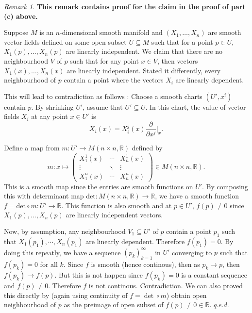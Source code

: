 \documentclass[a4paper]{article}
\theoremstyle{remark}
\newtheorem*{remark}{Remark}
\newcommand{\er}{\mathbb{R}} %
\renewcommand\qedsymbol{q.e.d.} %
\begin{document}
\begin{remark}
\textbf{This remark contains proof for the claim in the proof of part (c) above.} 
 
 Suppose $M$ is an $n$-dimensional smooth manifold and $(X_1,\dots,X_n)$ are smooth vector fields defined on some open subset $U\subseteq M$ such that for a point $p \in U$, $X_1(p),\dots,X_n(p)$ are linearly independent. We claim that there are no neighbourhood $V$ of $p$ such that for any point $x \in V$, then vectors $X_1(x),\dots,X_n(x)$ are linearly independent. Stated it differently, every neighbourhood of $p$ contain a point where the vectors $X_i$ are linearly dependent. 

This will lead to contradiction as follows : Choose a  smooth charts $(U',x^i)$ contain $p$. By shrinking $U'$, assume that $U'\subseteq U$. In this chart, the value of vector fields $X_i$ at any point $x \in U'$ is
$$
X_i(x) = X_i^j(x) \frac{\partial}{\partial x^j}\bigg|_x.
$$

Define a map from $m : U' \to M(n\times n,\mathbb{R} )$  defined by 
$$
m : x \mapsto 
\begin{pmatrix}
    X_1^1(x) & \cdots & X_n^1(x) \\
    \vdots & \ddots & \vdots \\
    X_1^n(x) & \cdots & X_n^n(x)
\end{pmatrix} \in M(n\times n,\mathbb{R} ).
$$
This is a smooth map since the entries are smooth functions on $U'$. By composing this with determinant map $\text{det} : M(n\times n, \mathbb{R}) \to \mathbb{R}$, we have a smooth function $f = \text{det} \circ m : U' \to \mathbb{R}$. This function is also smooth and at $p \in U'$, $f(p) \neq 0$ since $X_1(p),\dots,X_n(p)$ are linearly independent vectors.

Now, by assumption, any neighbourhood $V_1 \subseteq U'$ of $p$ contain a point $p_1$ such that $X_1(p_1),\cdots,X_n(p_1)$ are linearly dependent. Therefore $f(p_1) = 0$. By doing this repeatly, we have a sequence $(p_k)_{k=1}^{\infty}$ in $U'$ converging to $p$ such that $f(p_k) =0$ for all $k$. Since $f$ is smooth (hence continous), then as $p_k \to p$, then $f(p_k) \to f(p)$. But this is not happen since $f(p_k)= 0$ is a constant sequence and $f(p) \neq 0$. Therefore $f$ is not continous. Contradiction. We can also proved this directly by (again using continuity of $f = \det \circ m$) obtain open neighbourhood of $p$ as the preimage of open subset of $f(p) \neq 0 \in \er$. $\qedsymbol$
\end{remark}
\end{document}
